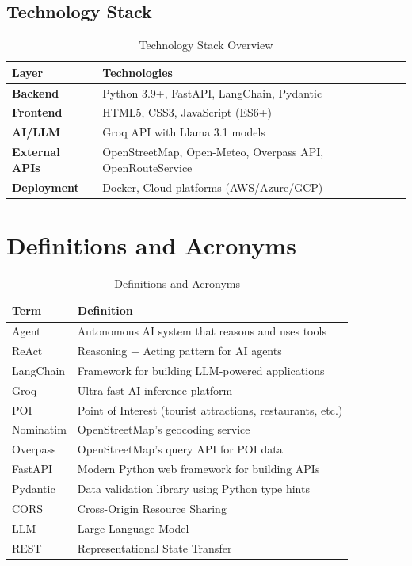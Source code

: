 \documentclass[12pt,a4paper]{report}
\begin{document}
\subsection{Technology Stack}

\begin{table}[H]
\centering
\begin{tabular}{|l|p{10cm}|}
\hline
\textbf{Layer} & \textbf{Technologies} \\
\hline
\textbf{Backend} & Python 3.9+, FastAPI, LangChain, Pydantic \\
\hline
\textbf{Frontend} & HTML5, CSS3, JavaScript (ES6+) \\
\hline
\textbf{AI/LLM} & Groq API with Llama 3.1 models \\
\hline
\textbf{External APIs} & OpenStreetMap, Open-Meteo, Overpass API, OpenRouteService \\
\hline
\textbf{Deployment} & Docker, Cloud platforms (AWS/Azure/GCP) \\
\hline
\end{tabular}
\caption{Technology Stack Overview}
\label{tab:techstack}
\end{table}

\section{Definitions and Acronyms}

\begin{table}[H]
\centering
\begin{tabular}{|l|p{10cm}|}
\hline
\textbf{Term} & \textbf{Definition} \\
\hline
Agent & Autonomous AI system that reasons and uses tools \\
\hline
ReAct & Reasoning + Acting pattern for AI agents \\
\hline
LangChain & Framework for building LLM-powered applications \\
\hline
Groq & Ultra-fast AI inference platform \\
\hline
POI & Point of Interest (tourist attractions, restaurants, etc.) \\
\hline
Nominatim & OpenStreetMap's geocoding service \\
\hline
Overpass & OpenStreetMap's query API for POI data \\
\hline
FastAPI & Modern Python web framework for building APIs \\
\hline
Pydantic & Data validation library using Python type hints \\
\hline
CORS & Cross-Origin Resource Sharing \\
\hline
LLM & Large Language Model \\
\hline
REST & Representational State Transfer \\
\hline
\end{tabular}
\caption{Definitions and Acronyms}
\label{tab:definitions}
\end{table}
\end{document}
